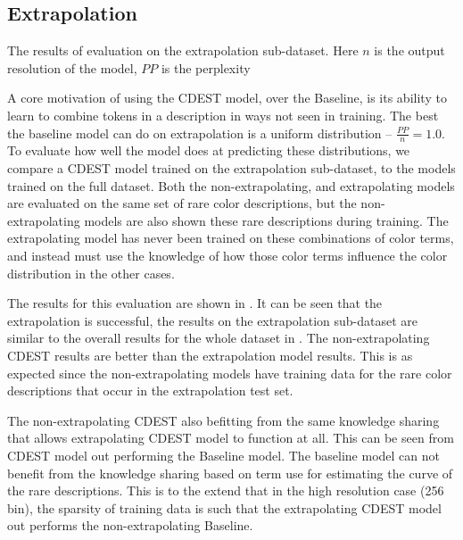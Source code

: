 \documentclass[11pt,letterpaper]{article}
\begin{document}
\subsection{Extrapolation}

\begin{table}
	\centering
	\caption{\label{tblresextrapo} The results of evaluation on the extrapolation sub-dataset. Here $n$ is the output resolution of the model, $PP$ is the perplexity}
\end{table}


A core motivation of using the CDEST model, over the Baseline, is its ability to learn to combine tokens in a description in ways not seen in training.
The best the baseline model can do on extrapolation is a uniform distribution -- $\frac{PP}{n}=1.0$.
To evaluate how well the model does at predicting these distributions,
we compare a CDEST model trained on the extrapolation sub-dataset, to the models trained on the full dataset.
Both the non-extrapolating, and extrapolating models are evaluated on the same set of rare color descriptions,
but the non-extrapolating models are also shown these rare descriptions during training.
The extrapolating model has never been trained on these combinations of color terms,
and instead must use the knowledge of how those color terms influence the color distribution in the other cases.

The results for this evaluation are shown in .
It can be seen that the extrapolation is successful, the results on the extrapolation sub-dataset are similar to the overall results for the whole dataset in .
The non-extrapolating CDEST results are better than the extrapolation model results.
This is as expected since the non-extrapolating models have training data for the rare color descriptions that occur in the extrapolation test set.

The non-extrapolating CDEST also befitting from the same knowledge sharing that allows extrapolating CDEST model to function at all.
This can be seen from CDEST model out performing the Baseline model.
The baseline model can not benefit from the knowledge sharing based on term use for estimating the curve of the rare descriptions.
This is to the extend that in the high resolution case (256 bin),
the sparsity of training data is such that the extrapolating CDEST model out performs the non-extrapolating Baseline.
\end{document}
